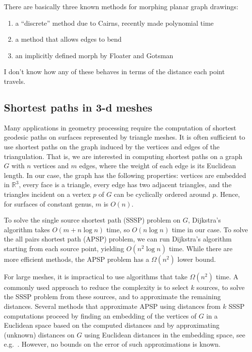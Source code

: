 \documentclass{patmorin}
\newcommand{\poser}[1]{\noindent{\textit{#1}}}
\begin{document}
There are basically three known methods for morphing planar graph
drawings:

\begin{enumerate}
\item a ``discrete'' method due to Cairns, recently made polynomial time~\cite{poly-morph}
\item a method that allows edges to bend~\cite{Lubiw-Petrick}
\item an implicitly defined morph by Floater and Gotsman~\cite{Floater-Gotsman}
\end{enumerate}

I don't know how any of these behaves in terms of the distance each
point travels.

\subsection{Shortest paths in 3-d meshes}

\poser{Stefanie Wuhrer}

Many applications in geometry processing require the computation of
shortest geodesic paths on surfaces represented by triangle meshes. It
is often sufficient to use shortest paths on the graph induced by the
vertices and edges of the triangulation. That is, we are interested
in computing shortest paths on a graph $G$ with $n$ vertices and $m$
edges, where the weight of each edge is its Euclidean length. In our
case, the graph has the following properties: vertices are embedded in
$\mathbb{R}^3$, every face is a triangle, every edge has two adjacent
triangles, and the triangles incident on a vertex $p$ of $G$ can be
cyclically ordered around $p$. Hence, for surfaces of constant genus,
$m$ is $O(n)$.

To solve the single source shortest path (SSSP) problem on $G$,
Dijkstra's algorithm takes $O(m + n \log n)$ time, so $O(n \log n)$
time in our case. To solve the all pairs shortest path (APSP) problem,
we can run Dijkstra's algorithm starting from each source point, yielding
$O(n^2 \log n)$ time. While there are more efficient methods, the APSP
problem has a $\Omega(n^2)$ lower bound.

For large meshes, it is impractical to use algorithms that take
$\Omega(n^2)$ time. A commonly used approach to reduce the complexity
is to select $k$ sources, to solve the SSSP problem from these
sources, and to approximate the remaining distances. Several methods
that approximate APSP using distances from $k$ SSSP computations
proceed by finding an embedding of the vertices of $G$ in a Euclidean
space based on the computed distances and by approximating (unknown)
distances on $G$ using Euclidean distances in the embedding space, see
e.g.~\cite{giard_macq_09_unfold, BenAzouz_etal_07}. However, no bounds
on the error of such approximations is known.
\end{document}
